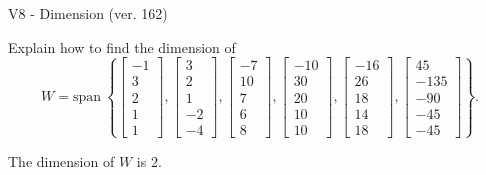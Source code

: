 \begin{exercise}
  \begin{exerciseTitle}V8 - Dimension (ver. 162)\end{exerciseTitle}
  \begin{exerciseStatement}
    Explain how to find the dimension of 
\[W=\mathrm{span}\ \left\{\left[\begin{array}{r}
-1 \\
3 \\
2 \\
1 \\
1
\end{array}\right] , \left[\begin{array}{r}
3 \\
2 \\
1 \\
-2 \\
-4
\end{array}\right] , \left[\begin{array}{r}
-7 \\
10 \\
7 \\
6 \\
8
\end{array}\right] , \left[\begin{array}{r}
-10 \\
30 \\
20 \\
10 \\
10
\end{array}\right] , \left[\begin{array}{r}
-16 \\
26 \\
18 \\
14 \\
18
\end{array}\right] , \left[\begin{array}{r}
45 \\
-135 \\
-90 \\
-45 \\
-45
\end{array}\right]\right\}.\]



  \end{exerciseStatement}
  \begin{exerciseAnswer}
   The dimension of \(W\) is  \(2\).
  


  \end{exerciseAnswer}
\end{exercise}